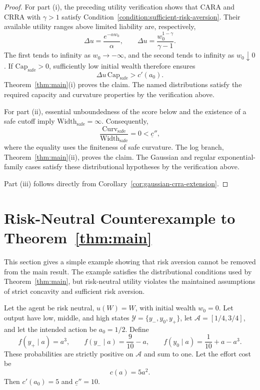 \documentclass[12pt]{article}
\begin{document}
\begin{proof}
For part (i), the preceding utility verification shows that CARA and CRRA with
$\gamma>1$ satisfy Condition~\ref{condition:sufficient-risk-aversion}.  Their available utility ranges
above limited liability are, respectively,
\[
 \Delta u=\frac{e^{-\alpha w_0}}{\alpha},
 \qquad
 \Delta u=\frac{w_0^{1-\gamma}}{\gamma-1}.
\]
The first tends to infinity as $w_0\to-\infty$, and the second tends to
infinity as $w_0\downarrow0$.  If
$\mathrm{Cap}_{\mathrm{safe}}>0$, sufficiently low initial wealth therefore
ensures
\[
 \Delta u\,\mathrm{Cap}_{\mathrm{safe}}>c'(a_0).
\]
Theorem~\ref{thm:main}(i) proves the claim.  The named distributions satisfy
the required capacity and curvature properties by the verification above.

For part (ii), essential unboundedness of the score below and the existence of
a safe cutoff imply
$\mathrm{Width}_{\mathrm{safe}}=\infty$.  Consequently,
\[
 \frac{\mathrm{Curv}_{\mathrm{safe}}}
      {\mathrm{Width}_{\mathrm{safe}}}=0<\underline c'',
\]
where the equality uses the finiteness of safe curvature.  The log branch,
Theorem~\ref{thm:main}(ii), proves the claim.  The Gaussian and regular
exponential-family cases satisfy these distributional hypotheses by the
verification above.

Part (iii) follows directly from
Corollary~\ref{cor:gaussian-crra-extension}.
\end{proof}

\section{Risk-Neutral Counterexample to Theorem~\ref{thm:main}}
\label{sec:risk-neutral-counterexample}

This section gives a simple example showing that risk aversion cannot be
removed from the main result.  The example satisfies the distributional
conditions used by Theorem~\ref{thm:main}, but risk-neutral utility violates
the maintained assumptions of strict concavity and sufficient risk aversion.

Let the agent be risk neutral, $u(W)=W$, with initial wealth $w_0=0$.  Let
output have low, middle, and high states
$\mathcal Y=\{y_-,y_0,y_+\}$, let $\mathcal A=[1/4,3/4]$, and let the
intended action be $a_0=1/2$.  Define
\[
    f(y_+\mid a)=a^3,\qquad
    f(y_-\mid a)=\frac{9}{10}-a,\qquad
    f(y_0\mid a)=\frac{1}{10}+a-a^3.
\]
These probabilities are strictly positive on $\mathcal A$ and sum to one.
Let the effort cost be
\[
    c(a)=5a^2.
\]
Then $c'(a_0)=5$ and $\underline c''=10$.
\end{document}
